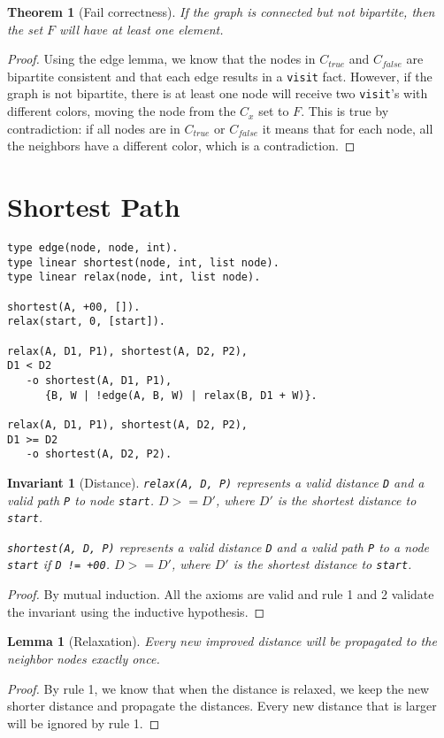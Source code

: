 \documentclass[9pt]{article}
\newtheorem{theorem}{Theorem}
\newtheorem{lemma}{Lemma}
\newtheorem{invariant}{Invariant}
\begin{document}
\begin{theorem}[Fail correctness]
If the graph is connected but not bipartite, then the set $F$ will have at least one element.
\end{theorem}
\begin{proof}
Using the edge lemma, we know that the nodes in  $C_{true}$ and $C_{false}$ are bipartite consistent and
that each edge results in a \texttt{visit} fact. However, if the graph is not bipartite, there is at least one node will receive two \texttt{visit}'s with different colors, moving the node from the $C_x$ set to $F$. This is true by contradiction: if all nodes are in $C_{true}$ or $C_{false}$ it means that for each node, all the neighbors have a different color, which is a contradiction.
\end{proof}

\section{Shortest Path}

\begin{verbatim}
type edge(node, node, int).
type linear shortest(node, int, list node).
type linear relax(node, int, list node).

shortest(A, +00, []).
relax(start, 0, [start]).

relax(A, D1, P1), shortest(A, D2, P2),
D1 < D2
   -o shortest(A, D1, P1),
      {B, W | !edge(A, B, W) | relax(B, D1 + W)}.

relax(A, D1, P1), shortest(A, D2, P2),
D1 >= D2
   -o shortest(A, D2, P2).
\end{verbatim}

\begin{invariant}[Distance]
\texttt{relax(A, D, P)} represents a valid distance \texttt{D} and a valid path \texttt{P} to node \texttt{start}. $D >= D'$, where $D'$ is the shortest distance to \texttt{start}.

\texttt{shortest(A, D, P)} represents a valid distance \texttt{D} and a valid path \texttt{P} to a node \texttt{start} if \texttt{D != +00}. $D >= D'$, where $D'$ is the shortest distance to \texttt{start}.
\end{invariant}
\begin{proof}
By mutual induction. All the axioms are valid and rule 1 and 2 validate the invariant using the inductive hypothesis.
\end{proof}

\begin{lemma}[Relaxation]
Every new improved distance will be propagated to the neighbor nodes exactly once.
\end{lemma}
\begin{proof}
By rule 1, we know that when the distance is relaxed, we keep the new shorter distance and propagate the distances. Every new distance that is larger will be ignored by rule 1.
\end{proof}
\end{document}
